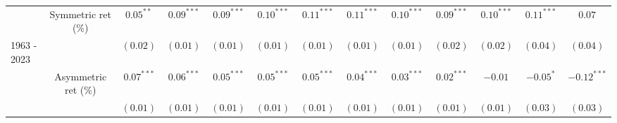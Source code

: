 \documentclass[
]{article}
\begin{document}
\begin{tabular}{lcccccccccccc}
   & Symmetric ret (\%) & $0.05^{**}$ & $0.09^{***}$ & $0.09^{***}$ & $0.10^{***}$ & $0.11^{***}$ & $0.11^{***}$ & $0.10^{***}$ & $0.09^{***}$ & $0.10^{***}$ & $0.11^{***}$ & $0.07$ \\ 
   \vspace{5pt}1963 - 2023 &  & $(0.02)$ & $(0.01)$ & $(0.01)$ & $(0.01)$ & $(0.01)$ & $(0.01)$ & $(0.01)$ & $(0.02)$ & $(0.02)$ & $(0.04)$ & $(0.04)$ \\ 
   & Asymmetric ret (\%) & $0.07^{***}$ & $0.06^{***}$ & $0.05^{***}$ & $0.05^{***}$ & $0.05^{***}$ & $0.04^{***}$ & $0.03^{***}$ & $0.02^{***}$ & $-0.01$ & $-0.05^{*}$ & $-0.12^{***}$ \\ 
   \vspace{5pt} &  & $(0.01)$ & $(0.01)$ & $(0.01)$ & $(0.01)$ & $(0.01)$ & $(0.01)$ & $(0.01)$ & $(0.01)$ & $(0.01)$ & $(0.03)$ & $(0.03)$ \\ 
   \bottomrule 
\end{tabular}
\end{document}
